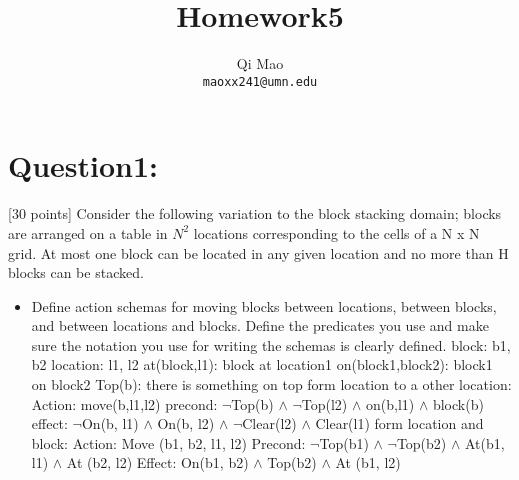 \documentclass{article}
\begin{document}
\title{Homework5}
\author{Qi Mao\\
  \texttt{maoxx241@umn.edu}}
\maketitle

\section{Question1:}
[30 points] Consider the following variation to the block stacking domain; blocks are arranged on a table in $N^2$ locations corresponding to the cells of a N x N grid. At most one block can be located in any given location and no more than H blocks can be stacked.

\begin{itemize}
    \item Define action schemas for moving blocks between locations, between blocks, and between locations and blocks. Define the predicates you use and make sure the notation you use for writing the schemas is clearly defined.\newline
    block: b1, b2\newline
    location: l1, l2\newline
    at(block,l1): block at location1\newline
    on(block1,block2): block1 on block2\newline
    Top(b): there is something on top\newline
    form location to a other location:\newline
    Action: move(b,l1,l2)\newline
    precond: $\neg$Top(b) $\wedge$ $\neg$Top(l2) $\wedge$ on(b,l1) $\wedge$ block(b)\newline
    effect: $\neg$On(b, l1) $\wedge$ On(b, l2) $\wedge$ $\neg$Clear(l2) $\wedge$ Clear(l1)\newline
    form location and block:\newline
    Action: Move (b1, b2, l1, l2)\newline
    Precond: $\neg$Top(b1) $\wedge$ $\neg$Top(b2) $\wedge$ At(b1, l1) $\wedge$ At (b2, l2)\newline
    Effect: On(b1, b2) $\wedge$ Top(b2) $\wedge$ At (b1, l2)\newline


\end{itemize}
\end{document}

